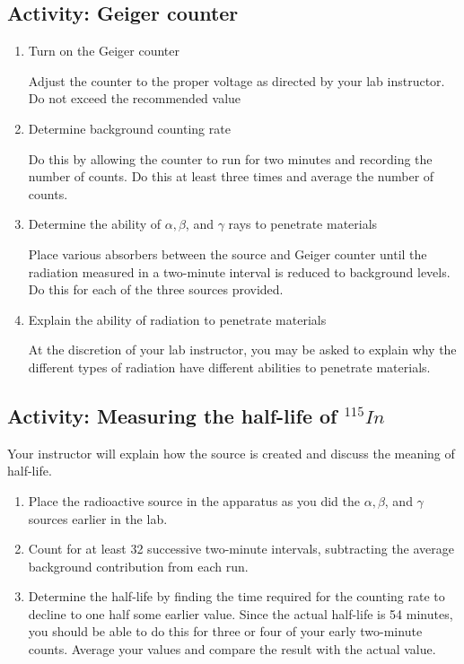 \subsection{Activity: Geiger counter}
\begin{enumerate}
	 \item Turn on the Geiger counter

Adjust the counter to the proper voltage as directed by your lab instructor. Do not exceed the recommended value

	\item Determine background counting rate
	
Do this by allowing the counter to run for two minutes and recording the number of counts. Do this at least three times and average the number of counts.

	\item Determine the ability of  $\alpha, \beta$, and $\gamma $ rays to penetrate materials

Place various absorbers between the source and Geiger counter until the radiation measured in a two-minute interval is reduced to background levels. Do this for each of the three sources provided.

	\item Explain the ability of radiation to penetrate materials

At the discretion of your lab instructor, you may be asked to explain why the different types of radiation have different abilities to penetrate materials.

\end{enumerate}


\subsection{Activity: Measuring the half-life of $^{115}In$}
Your instructor will explain how the source is created and discuss the meaning of half-life.
\begin{enumerate}
	\item Place the radioactive source in the apparatus as you did the $\alpha, \beta$, and $\gamma$ sources earlier in the lab.

	\item Count for at least 32 successive two-minute intervals, subtracting the average background contribution from each run.

	\item Determine the half-life by finding the time required for the counting rate to decline to one half some earlier value. Since the actual half-life is 54 minutes, you should be able to do this for three or four of your early two-minute counts. Average your values and compare the result with the actual value.
\end{enumerate}

